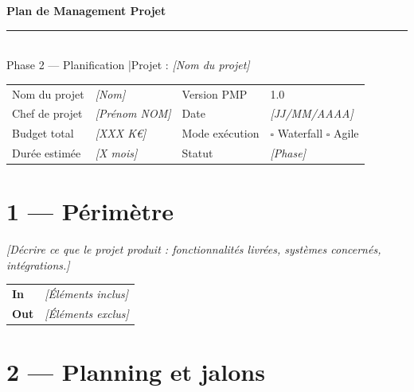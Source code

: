 \documentclass[11pt,a4paper,oneside]{report}
\begin{document}
\small

\begin{center}
{\LARGE\bfseries\color{cnNavy} Plan de Management Projet}\\[4pt]
\textcolor{cnOrange}{\rule{10cm}{1pt}}\\[4pt]
{\large\color{cnSlate} Phase 2 — Planification \quad|\quad Projet : \textit{[Nom du projet]}}
\end{center}

\vspace{4pt}
\renewcommand{\arraystretch}{1.4}
\begin{tabularx}{\textwidth}{L{3.5cm} Y L{3.5cm} Y}
\toprule
{} &  &  &  \\
\midrule
Nom du projet   & \textit{[Nom]}         & Version PMP    & 1.0 \\
Chef de projet  & \textit{[Prénom NOM]}  & Date           & \textit{[JJ/MM/AAAA]} \\
Budget total    & \textit{[XXX K€]}      & Mode exécution & $\square$ Waterfall \quad $\square$ Agile \\
Durée estimée   & \textit{[X mois]}      & Statut         & \textit{[Phase]} \\
\bottomrule
\end{tabularx}

\section*{1 — Périmètre}

\textit{[Décrire ce que le projet produit : fonctionnalités livrées, systèmes concernés, intégrations.]}

\renewcommand{\arraystretch}{1.3}
\begin{tabularx}{\textwidth}{L{1.5cm} Y}
\toprule
{}\th{} & \th{} \\
\midrule
{}\textbf{In}  & \textit{[Éléments inclus]} \\
\textbf{Out} & \textit{[Éléments exclus]} \\
\bottomrule
\end{tabularx}

\section*{2 — Planning et jalons}
\end{document}
